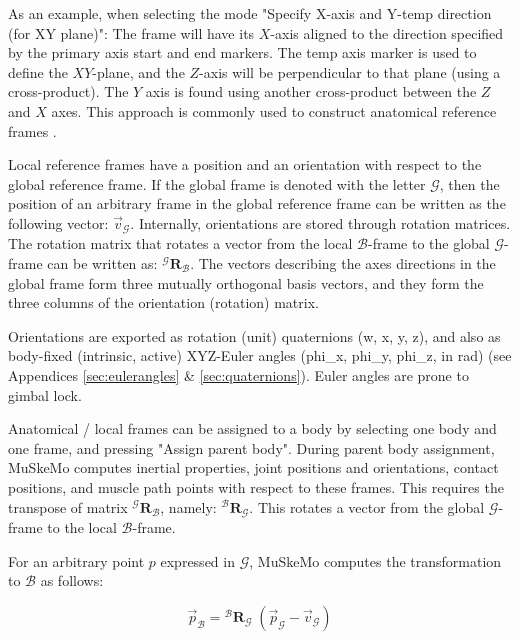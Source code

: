 \documentclass{article}
\begin{document}
As an example, when selecting the mode "Specify X-axis and Y-temp direction (for XY plane)": The frame will have its \(X\)-axis aligned to the direction specified by the primary axis start and end markers. The temp axis marker is used to define the \(XY\)-plane, and the \(Z\)-axis will be perpendicular to that plane (using a cross-product). The \(Y\) axis is found using another cross-product between the \(Z\) and \(X\) axes. This approach is commonly used to construct anatomical reference frames \cite{wuISBRecommendationsStandardization1995,wuISBRecommendationDefinitions2002,wuISBRecommendationDefinitions2005}.

Local reference frames have a position and an orientation with respect to the global reference frame. If the global frame is denoted with the letter \(\mathcal{G}\), then the position of an arbitrary frame in the global reference frame can be written as the following vector: \(\vec{v}_{\mathcal{G}}\). Internally, orientations are stored through rotation matrices. The rotation matrix that rotates a vector from the local \(\mathcal{B}\)-frame to the global \(\mathcal{G}\)-frame can be written as: \({}^{\mathcal{G}} \mathbf{R}_{\mathcal{B}}\). The vectors describing the axes directions in the global frame form three mutually orthogonal basis vectors, and they form the three columns of the orientation (rotation) matrix.

Orientations are exported as rotation (unit) quaternions (w, x, y, z), and also as body-fixed (intrinsic, active) XYZ-Euler angles (phi\_x, phi\_y, phi\_z, in rad) (see Appendices \ref{sec:eulerangles} \& \ref{sec:quaternions}). Euler angles are prone to gimbal lock. 

Anatomical / local frames can be assigned to a body by selecting one body and one frame, and pressing "Assign parent body". During parent body assignment, MuSkeMo computes inertial properties, joint positions and orientations, contact positions, and muscle path points with respect to these frames. This requires the transpose of matrix \({}^{\mathcal{G}} \mathbf{R}_{\mathcal{B}}\), namely: \({}^{\mathcal{B}} \mathbf{R}_{\mathcal{G}}\). This rotates a vector from the global \(\mathcal{G}\)-frame to the local \(\mathcal{B}\)-frame.

For an arbitrary point \(p\) expressed in \(\mathcal{G}\), MuSkeMo computes the transformation to \(\mathcal{B}\) as follows: 

\begin{equation}
\vec{p}_{\mathcal{B}} = {}^{\mathcal{B}} \mathbf{R}_{\mathcal{G}} \; (\vec{p}_{\mathcal{G}} - \vec{v}_{\mathcal{G}})
\end{equation}
\end{document}
